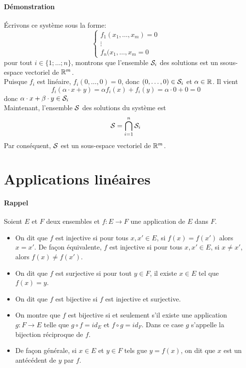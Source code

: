 \paragraph{Démonstration} Écrivons ce système sous la forme:
$$ \left\{ \begin{matrix}
  f_1(x_1, \ldots, x_m) = 0\\
  \vdots \\
  f_n(x_1, \ldots, x_m = 0
\end{matrix}$$
pour tout $i \in \{1; \ldots; n\}$, montrons que l'ensemble $\mathcal{S}_i$ des solutions est un ssous-espace vectoriel de $\mathbb{R}^m$. \\
Puisque $f_i$ est linéaire, $f_i(0, \ldots, 0) = 0$, donc $(0,  \ldots, 0) \in \mathcal{S}_i$ et $\alpha \in \mathbb{R}$. Il vient 
$$f_i(\alpha \cdot x + y) = \alpha f_i(x) + f_i(y) = \alpha \cdot 0 
+ 0 = 0$$
donc $\alpha \cdot x + \beta \cdot y \in \mathcal{S}_i$ \\
Maintenant, l'ensemble $\mathcal{S}$ des solutions du système est 
$$\mathcal{S} =  \bigcap_{i=1}^n {\mathcal{S}_i}$$
Par conséquent, $\mathcal{S}$ est un sous-espace vectoriel de $\mathbb{R}^m$.

%
%
\section{Applications linéaires}

\paragraph{Rappel} Soient $E$ et $F$ deux ensembles et $f: E \rightarrow F$ une application de $E$ dans $F$.
\begin{itemize}
 \item On dit que $f$ est injective si pour tous $x, x' \in E$, si $f(x) = f(x')$ alors $x=x'$. De façon équivalente, $f$ est injective si pour tous $x, x' \in E$, si $x \neq x'$, alors $f(x) \neq f(x')$.
  \item On dit que $f$ est surjective si pour tout $y \in F$, il existe $x \in E$ tel que $f(x) = y$. 
  \item On dit que $f$ est bijective si $f$ est injective et surjective.
  \item On montre que $f$ est bijective si et seulement s'il existe une application $g: F \rightarrow E$ telle que $g \circ f = id_E$ et $f \circ g = id_F$. Dans ce case $g$ s'appelle la bijection réciproque de $f$.
  \item De façon générale, si $x \in E$ et $y \in F$ tels gue $y = f(x)$, on dit que $x$ est un antécédent de $y$ par $f$.
\end{itemize}

